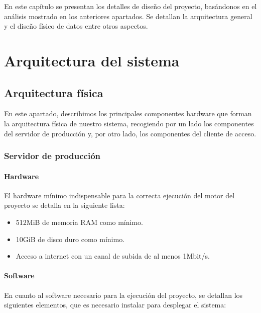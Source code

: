 En este capítulo se presentan los detalles de diseño del proyecto, basándonos en
el análisis mostrado en los anteriores apartados. Se detallan la arquitectura
general y el diseño físico de datos entre otros aspectos.

\section{Arquitectura del sistema}

\subsection{Arquitectura física}
\label{arquitectura-fisica}

En este apartado, describimos los principales componentes hardware que forman la
arquitectura física de nuestro sistema, recogiendo por un lado los componentes
del servidor de producción y, por otro lado, los componentes del cliente de acceso.

\subsubsection{Servidor de producción}
\label{subsec:entorno-produccion}

\paragraph{Hardware}

El hardware mínimo indispensable para la correcta ejecución del motor del
proyecto se detalla en la siguiente lista:

\begin{itemize}
\item 512MiB de memoria RAM como mínimo.
\item 10GiB de disco duro como mínimo.
\item Acceso a internet con un canal de subida de al menos 1Mbit/s.
\end{itemize}

\paragraph{Software}

En cuanto al software necesario para la ejecución del proyecto, se detallan los
siguientes elementos, que es necesario instalar para desplegar el sistema:

